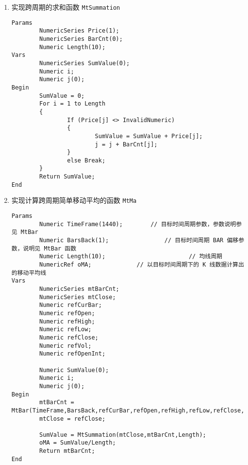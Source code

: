 \documentclass[11pt]{ctexart}
\begin{document}
\begin{enumerate}
\item 实现跨周期的求和函数 \texttt{MtSummation}

\begin{verbatim}
Params
        NumericSeries Price(1);
        NumericSeries BarCnt(0);
        Numeric Length(10);
Vars
        NumericSeries SumValue(0);
        Numeric i;
        Numeric j(0);
Begin
        SumValue = 0;
        For i = 1 to Length
        {
                If (Price[j] <> InvalidNumeric)
                {
                        SumValue = SumValue + Price[j];
                        j = j + BarCnt[j];
                }
                else Break;
        }
        Return SumValue;
End
\end{verbatim}

\item 实现计算跨周期简单移动平均的函数 \texttt{MtMa}

\begin{verbatim}
Params
        Numeric TimeFrame(1440);        // 目标时间周期参数，参数说明参见 MtBar
        Numeric BarsBack(1);                // 目标时间周期 BAR 偏移参数，说明见 MtBar 函数
        Numeric Length(10);                        // 均线周期
        NumericRef oMA;             // 以目标时间周期下的 K 线数据计算出的移动平均线
Vars
        NumericSeries mtBarCnt;
        NumericSeries mtClose;
        Numeric refCurBar;
        Numeric refOpen;
        Numeric refHigh;
        Numeric refLow;
        Numeric refClose;
        Numeric refVol;
        Numeric refOpenInt;

        Numeric SumValue(0);
        Numeric i;
        Numeric j(0);
Begin
        mtBarCnt = MtBar(TimeFrame,BarsBack,refCurBar,refOpen,refHigh,refLow,refClose,refVol,refOpenInt);
        mtClose = refClose;

        SumValue = MtSummation(mtClose,mtBarCnt,Length);
        oMA = SumValue/Length;
        Return mtBarCnt;
End
\end{verbatim}
\end{enumerate}
\end{document}
